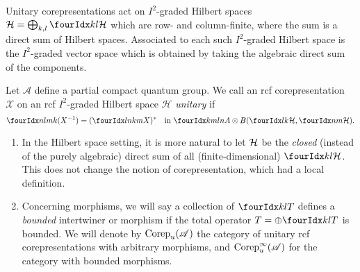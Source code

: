 Unitary corepresentations act on $I^{2}$-graded Hilbert spaces $\Hsp =
\bigoplus_{k,l} \Gru{\Hsp}{k}{l}$ which are row- and column-finite,
where the sum is a direct sum of Hilbert spaces. Associated to each
such $I^{2}$-graded Hilbert space is the $I^{2}$-graded vector space
which is obtained by taking the algebraic direct sum of the
components. 

\begin{Def} Let $\mathscr{A}$ define a partial compact quantum
  group. We call an rcf corepresentation $\mathscr{X}$ on an rcf
  $I^2$-graded Hilbert space $\mathcal{H}$ \emph{unitary}
  if \[\Gr{(X^{-1})}{n}{m}{l}{k}=(\Gr{X}{l}{k}{n}{m})^{*}\quad
  \textrm{in }\Gr{A}{k}{l}{m}{n}\otimes
  B(\Gru{\Hsp}{l}{k},\Gru{\Hsp}{n}{m}).\]
\end{Def} 
\begin{Rem} \begin{enumerate} \item In the Hilbert space setting, it is more natural to let $\mathcal{H}$ be the \emph{closed} (instead of the purely algebraic) direct sum of all (finite-dimensional) $\Gru{\Hsp}{k}{l}$. This does not change the notion of corepresentation, which had a local definition.
\item Concerning morphisms, we will say a collection of $\Gru{T}{k}{l}$ defines a \emph{bounded} intertwiner or morphism if the total operator $T= \oplus \Gru{T}{k}{l}$ is bounded. We will denote by $\mathrm{Corep}_{u}(\mathscr{A})$ the category of unitary rcf corepresentations with arbitrary morphisms, and $\mathrm{Corep}_{u}^{\infty}(\mathscr{A})$ for the category with bounded morphisms.
\end{enumerate}
\end{Rem}

